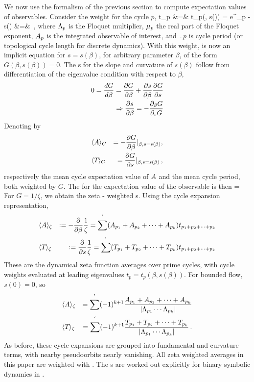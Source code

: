 \documentclass[aps,pre,
                showpacs,
                twocolumn,
                groupedaddress,
                superscriptaddress,
                floatfix]{revtex4-1}
\begin{document}
We now use the formalism of the previous section to compute expectation values of
observables. Consider the weight for the cycle $p$,
\bea
t_{p} &=& t_{p}(\beta, s(\beta))
       =  e^{\beta \Obser_{p} - s(\beta)}
\continue
       &=& \exp{}
\,,
\label{cyclWeight}
\eea
where $\Lambda_{p}$ is the Floquet multiplier, $\eigRe_{p}$ the real
part of the Floquet exponent, $A_{p}$ is the integrated observable
of interest, and $\period{p}$ is cycle period (or topological cycle
length for discrete dynamics). With this weight,  is now
an implicit equation for $s=s(\beta)$, for arbitrary parameter $\beta$,
of the form $G(\beta, s(\beta)) = 0$. The {\cycForm s} for the slope and
curvature of $s(\beta)$ follow from differentiation of the eigenvalue
condition with respect to $\beta$,
\begin{eqnarray*}
0 = \frac{d G}{d\beta}
= \frac{\partial G}{\partial \beta} + \frac{\partial s}{\partial \beta}\frac{\partial G}{\partial s}
\\
\Rightarrow \frac{\partial s}{\partial \beta} = -\frac{\partial_{\beta}G}{\partial_{s} G}
\end{eqnarray*}
Denoting by
\begin{eqnarray*}
&\langle {\ensuremath{A}} \rangle_{G}& = -\frac{\partial G}{\partial \beta}|_{\beta, s=s(\beta)}
,\\ &\langle {{\ensuremath{T_{}}}} \rangle_{G}& = \frac{\partial G}{\partial s}\vert_{\beta, s=s(\beta)}
\,,
\end{eqnarray*}
respectively the mean cycle expectation value of $A$ and the mean cycle
period, both weighted by $G$. The {\cycForm} for the
expectation value of the observable is then
\beq
\expct{\obser} = 
For $G = 1/\zeta$, we obtain the zeta - weighted {\cycForm s}. Using
the cycle expansion representation,
\begin{eqnarray*}
&\expct{\Obser}_{\zeta}
  &:=-\frac{\pde}{\pde \beta}\frac{1}{\zeta}
  =\sum^{'}(\Obser_{p_{1}}+\Obser_{p_{2}}+\cdots+\Obser_{p_{k}})t_{p_{1}+p_{2}+\cdots+p_{k}} \\
&\expct{\period{}}_{\zeta}&:=\frac{\pde}{\pde s}\frac{1}{\zeta}=\sum^{'}(T_{p_{1}}+T_{p_{2}}+\cdots+T_{p_{k}})t_{p_{1}+p_{2}+\cdots+p_{k}}
\end{eqnarray*}
These are the dynamical zeta function averages over prime cycles, with
cycle weights evaluated at leading eigenvalues $t_{p} =
t_{p}(\beta,s(\beta))$. For bounded flow, $s(0)=0$, so
\begin{eqnarray*}
&\langle {\ensuremath{A}} \rangle_{\zeta}& = \sum^{'}(-1)^{k+1}\frac{A_{p_{1}}+A_{p_{2}}+\cdots+A_{p_{k}}}{\vert \Lambda_{p_{1}}\cdots\Lambda_{p_{k}}\vert}\\
&\langle {{\ensuremath{T_{}}}} \rangle_{\zeta}& = \sum^{'}(-1)^{k+1}\frac{T_{p_{1}}+T_{p_{2}}+\cdots+T_{p_{k}}}{\vert \Lambda_{p_{1}}\cdots\Lambda_{p_{k}}\vert}
\,.
\end{eqnarray*}
As before, these cycle expansions are grouped into fundamental and
curvature terms, with nearby pseudoorbits nearly vanishing. All zeta
weighted averages in this paper are weighted with . The
{\cycForm s} are worked out explicitly for binary symbolic
dynamics in .
\end{document}
